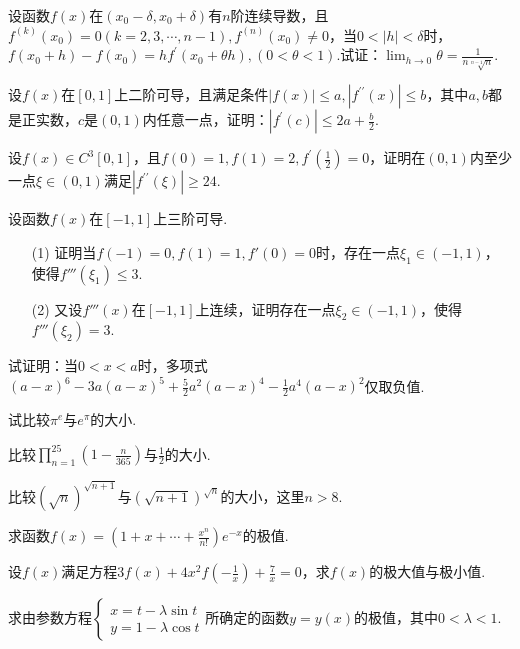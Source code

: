 \begin{xiti}
	\item 设函数$f(x)$在$( x_{0} - \delta , x_{0} + \delta )$有$n$阶连续导数，且$f ^ { ( k ) } \left( x _ { 0 } \right) = 0 ( k = 2,3 , \cdots , n - 1 ) , f ^ { ( n ) } \left( x _ { 0 } \right) \neq 0$，当$0 < | h | < \delta$时，$f \left( x _ { 0 } + h \right) - f \left( x _ { 0 } \right) = h f ^ { \prime } \left( x _ { 0 } + \theta h \right) , ( 0 < \theta < 1 )$.试证：$\lim _ { h \rightarrow 0 } \theta = \frac { 1 } { n \sqrt [ n - 1 ] { n } }$.
	\item 设$f(x)$在$[0,1]$上二阶可导，且满足条件$| f ( x ) | \leqslant a , \left| f ^ { \prime \prime } ( x ) \right| \leqslant b$，其中$a,b$都是正实数，$c$是$(0,1)$内任意一点，证明：$\left| f ^ { \prime } ( c ) \right| \leqslant 2 a + \frac { b } { 2 }$.
	\item 设$f ( x ) \in C ^ { 3 } [ 0,1 ]$，且$f ( 0 ) = 1 , f ( 1 ) = 2 , f ^ { \prime } \left( \frac { 1 } { 2 } \right) = 0$，证明在$(0,1)$内至少一点$\xi \in (0,1)$满足$\left| f ^ { \prime \prime } ( \xi ) \right| \geqslant 24$.
	\item 设函数$f(x)$在$[-1,1]$上三阶可导.
	\begin{enumerate}
		\item[(1)] 证明当$f(-1)=0,f(1)=1,f'(0)=0$时，存在一点$\xi_{ 1 }\in (-1,1)$，使得$f'''(\xi_{ 1 })\leq 3$.
		\item[(2)] 又设$f'''(x)$在$[-1,1]$上连续，证明存在一点$\xi_{ 2 }\in (-1,1)$，使得$f'''(\xi_{ 2 })= 3$.
	\end{enumerate}
\item 试证明：当$0<x<a$时，多项式$( a - x ) ^ { 6 } - 3 a ( a - x ) ^ { 5 } + \frac { 5 } { 2 } a ^ { 2 } ( a - x ) ^ { 4 } - \frac { 1 } { 2 } a ^ { 4 } ( a - x ) ^ { 2 }$仅取负值.
\item 试比较$\pi ^{e}$与$e^{\pi}$的大小.
\item 比较$\prod _ { n = 1 } ^ { 25 } \left( 1 - \frac { n } { 365 } \right)$与$\frac{1}{2}$的大小.
\item 比较$( \sqrt { n } ) ^ { \sqrt { n + 1 } }$与$( \sqrt { n + 1 } ) ^ { \sqrt { n } }$的大小，这里$n>8$.
\item 求函数$f ( x ) = \left( 1 + x + \cdots + \frac { x ^ { n } } { n ! } \right) e ^ { - x }$的极值.
\item 设$f(x)$满足方程$3 f ( x ) + 4 x ^ { 2 } f \left( - \frac { 1 } { x } \right) + \frac { 7 } { x } = 0$，求$f(x)$的极大值与极小值.
\item 求由参数方程$\left\{ \begin{array} { l } { x = t - \lambda \sin t } \\ { y = 1 - \lambda \cos t } \end{array} \right.$所确定的函数$y=y(x)$的极值，其中$0<\lambda<1$.

\end{xiti}
